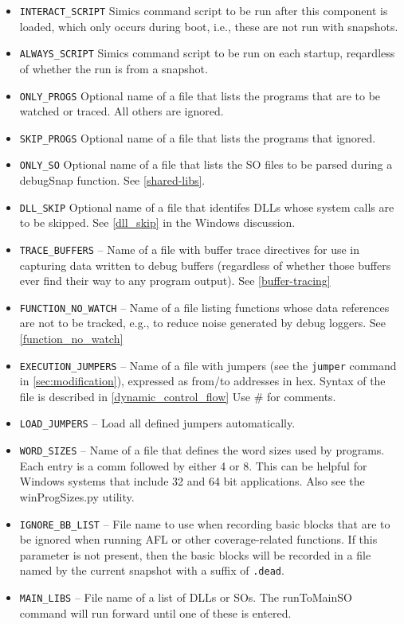 \documentclass[titlepage]{article}
\begin{document}
\begin{itemize}
x86Mixed; x8632; x8664.
\item {\tt INTERACT\_SCRIPT} Simics command script to be run after this component is loaded, which only occurs during boot, i.e., these are not run with snapshots.
\item {\tt ALWAYS\_SCRIPT} Simics command script to be run on each startup, reqardless of whether the run is from a snapshot.
\item {\tt ONLY\_PROGS} Optional name of a file that lists the programs that are to be watched or traced.  All others are ignored.
\item {\tt SKIP\_PROGS} Optional name of a file that lists the programs that ignored.
\item {\tt ONLY\_SO} Optional name of a file that lists the SO files to be parsed during a debugSnap function. See \ref{shared-libs}.
\item {\tt DLL\_SKIP} Optional name of a file that identifes DLLs whose system calls are to be skipped.  See \ref{dll_skip} in the Windows discussion.
\item {\tt TRACE\_BUFFERS} -- Name of a file with buffer trace directives for use in capturing data written to debug buffers (regardless of whether those
buffers ever find their way to any program output). See \ref{buffer-tracing}
\item {\tt FUNCTION\_NO\_WATCH} -- Name of a file listing functions whose data references are not to be tracked, e.g., to reduce noise generated by debug loggers. See 
\ref{function_no_watch}
\item {\tt EXECUTION\_JUMPERS} -- Name of a file with jumpers (see the {\tt jumper} command in \ref{sec:modification}), expressed as 
from/to addresses in hex.  Syntax of the file is described in \ref{dynamic_control_flow}  Use \# for comments.  
\item {\tt LOAD\_JUMPERS} -- Load all defined jumpers automatically.
\item {\tt WORD\_SIZES} -- Name of a file that defines the word sizes used by programs.  Each entry is a comm followed by either 4 or 8.
This can be helpful for Windows systems that include 32 and 64 bit applications.  Also see the winProgSizes.py utility.
\item {\tt IGNORE\_BB\_LIST} -- File name to use when recording basic blocks that are to be ignored when running AFL or other coverage-related functions.  If this parameter
is not present, then the basic blocks will be recorded in a file named by the current snapshot with a suffix of {\tt .dead}.
\item {\tt MAIN\_LIBS} -- File name of a list of DLLs or SOs.  The runToMainSO command will run forward until one of these is entered.

\end{itemize}
\end{document}
